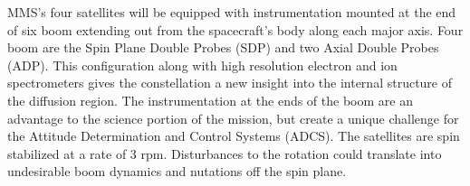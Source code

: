MMS's four satellites will be equipped with instrumentation mounted at the end of six boom extending out from the spacecraft's body along each major axis.  Four boom are the Spin Plane Double Probes (SDP) and two Axial Double Probes (ADP).  This configuration along with high resolution electron and ion spectrometers gives the constellation a new insight into the internal structure of the diffusion region.  The instrumentation at the ends of the boom are an advantage to the science portion of the mission, but create a unique challenge for the Attitude Determination and Control Systems (ADCS).  The satellites are spin stabilized at a rate of 3 rpm.  Disturbances to the rotation could translate into undesirable boom dynamics and nutations off the spin plane.







